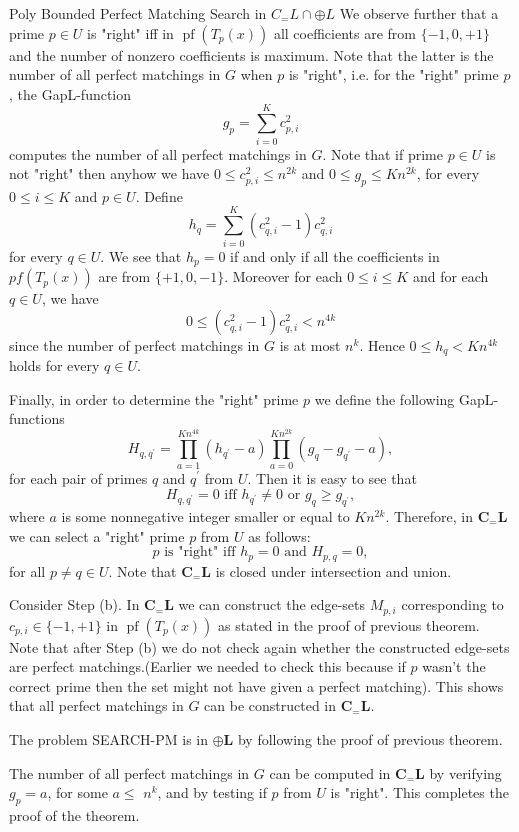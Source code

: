 \documentclass{beamer}
\begin{document}
\begin{frame}[allowframebreaks]{Poly Bounded Perfect Matching Search in $C_=L \cap \oplus L$}
	We observe further that a prime $p \in U$ is "right" iff in $\operatorname{pf}\left(T_p(x)\right)$ all coefficients are from $\{-1,0,+1\}$ and the number of nonzero coefficients is maximum. Note that the latter is the number of all perfect matchings in $G$ when $p$ is "right", i.e. for the "right" prime $p$, the GapL-function
	$$
	g_p=\sum_{i=0}^K c_{p, i}^2
	$$
	computes the number of all perfect matchings in $G$. Note that if prime $p \in U$ is not "right" then anyhow we have $0 \leq c_{p, i}^2 \leq n^{2 k}$ and $0 \leq g_p \leq K n^{2 k}$, for every $0 \leq i \leq K$ and $p \in U$.
	Define
	$$
	h_q=\sum_{i=0}^K\left(c_{q, i}^2-1\right) c_{q, i}^2
	$$
	for every $q \in U$. We see that $h_p=0$ if and only if all the coefficients in $pf(T_p(x))$ are from $\{+1,0,-1\}$. Moreover for each 
	$0 \leq i \leq K$ and for each $q \in U$, we have
	$$
	0 \leq\left(c_{q, i}^2-1\right) c_{q, i}^2<n^{4 k}
	$$
	since the number of perfect matchings in $G$ is at most $n^k$. Hence $0 \leq h_q<K n^{4 k}$ holds for every $q \in U$.
	
	Finally, in order to determine the "right" prime $p$ we define the following GapL-functions
	$$
	H_{q, q^{\prime}}=\prod_{a=1}^{K n^{4 k}}\left(h_{q^{\prime}}-a\right) \prod_{a=0}^{K n^{2 k}}\left(g_q-g_{q^{\prime}}-a\right),
	$$
	for each pair of primes $q$ and $q^{\prime}$ from $U$. Then it is easy to see that
	$$
	H_{q, q^{\prime}}=0 \text { iff } h_{q^{\prime}} \neq 0 \text { or } g_q \geq g_{q^{\prime}},
	$$
	where $a$ is some nonnegative integer smaller or equal to $K n^{2 k}$.  Therefore, in $\mathbf{C}_{=} \mathbf{L}$ we can select a "right" prime $p$ from $U$ as follows:
	$$
	p \text { is "right" iff } h_p=0 \text { and } H_{p, q}=0,
	$$
	for all $p \neq q \in U$. Note that $\mathbf{C}_{=} \mathbf{L}$ is closed under intersection and union.
	
	Consider Step (b). In $\mathbf{C}_{=} \mathbf{L}$ we can construct the edge-sets $M_{p, i}$ corresponding to $c_{p, i} \in\{-1,+1\}$ in $\operatorname{pf}\left(T_p(x)\right)$ as stated in the proof of previous theorem. Note that after Step (b) we do not check again whether the constructed edge-sets are perfect matchings.(Earlier we needed to check this because if $p$ wasn't the correct prime then the set might not have given a perfect matching). This shows that all perfect matchings in $G$ can be constructed in $\mathbf{C}_{=} \mathbf{L}$.
	
	The problem SEARCH-PM is in $\oplus \mathbf{L}$ by following the proof of previous theorem.
	
	The number of all perfect matchings in $G$ can be computed in $\mathbf{C}_{=} \mathbf{L}$ by verifying $g_p=a$, for some $a \leq$ $n^k$, and by testing if $p$ from $U$ is "right".
	This completes the proof of the theorem.
	
	
\end{frame}
\end{document}
